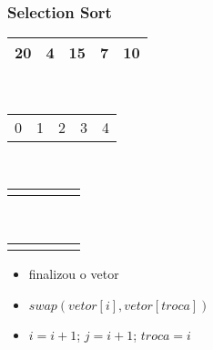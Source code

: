 \documentclass{beamer}
\begin{document}
\begin{frame}
    \frametitle{Selection Sort}
    \begin{center}
        \begin{table}
            \begin{tabular}{| p{0.25cm} | p{0.25cm} | p{0.25cm} | p{0.25cm} | p{0.25cm} |}
                \hline
                20 & 4 & 15 & 7 & 10 \\ \hline
            \end{tabular} \\
            \begin{tabular}{p{0.25cm} p{0.25cm} p{0.25cm} p{0.25cm} p{0.25cm}}
                0 & 1 & 2 & 3 & 4
            \end{tabular} \\
            \begin{tabular}{p{0.25cm} p{0.25cm} p{0.25cm} p{0.25cm} p{0.25cm}}
                \color{blue}{$\uparrow$} & & & & \color{red}{$\uparrow$}
            \end{tabular} \\
            \begin{tabular}{p{0.25cm} p{0.25cm} p{0.25cm} p{0.25cm} p{0.25cm}}
                \color{blue}{i} & & & &\color{red}{j}
            \end{tabular}
        \end{table}
	\end{center}
    \color{green}{$troca = 1$}
    \begin{itemize}[<+->]
        \item finalizou o vetor
        \item $swap(vetor[i], vetor[troca])$
        \item $i = i + 1$; $j = i + 1$; $troca = i$
    \end{itemize}
\end{frame}
\end{document}

